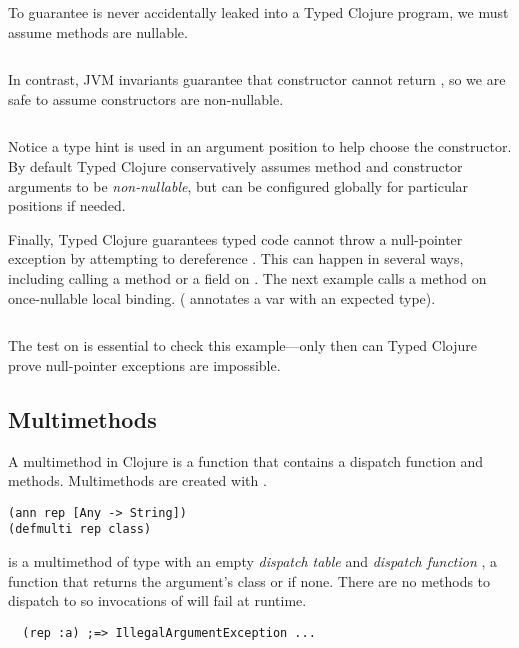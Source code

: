 To guarantee  is never accidentally leaked into a Typed Clojure program,
we must assume methods are nullable.

\begin{exmp}
\inputminted[firstline=12,lastline=13]{clojure}{code/demo/src/demo/parent3.clj}
\end{exmp}

In contrast, JVM invariants guarantee that  constructor cannot return ,
so we are safe to assume constructors are non-nullable.

\begin{Code}
\begin{exmp}
\inputminted[firstline=15,lastline=16]{clojure}{code/demo/src/demo/parent3.clj}
\end{exmp}
\end{Code}

Notice a type hint is used in an argument position to help choose the 
constructor. By default Typed Clojure conservatively assumes method and constructor arguments to be \emph{non-nullable},
but can be configured globally for particular positions if needed.

Finally, Typed Clojure guarantees typed code cannot throw a null-pointer exception
by attempting to dereference . This can happen in several ways, including
calling a method or a field on .
The next example calls a method on once-nullable local binding.
( annotates a var with an expected type).

\begin{exmp}
\inputminted[firstline=6,lastline=8]{clojure}{code/demo/src/demo/parent3.clj}
\end{exmp}

The test on  is essential to check this example---only then can Typed Clojure
prove null-pointer exceptions are impossible.

\subsection{Multimethods}

A multimethod in Clojure is a function that contains a dispatch
function and methods. Multimethods are created with {}.
\begin{verbatim}
(ann rep [Any -> String])
(defmulti rep class)
\end{verbatim}
 is a multimethod of type  with an empty \emph{dispatch table}
and \emph{dispatch function} , a function that returns the argument's class or  if none.
There are no methods to dispatch to so invocations of  will fail at runtime.
\begin{verbatim}
  (rep :a) ;=> IllegalArgumentException ...
\end{verbatim}

